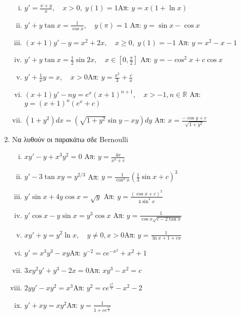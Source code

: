 \begin{enumerate}
    \begin{enumerate}[i)]
      \item  $y'=\frac{x+y}{x}, \quad x>0, \; y(1)=1$\hfill Απ: $y=x(1+\ln x)$ %
      \item $y'+y\tan x =\frac{1}{\cos x}, \quad y(\pi)=1$
        \hfill Απ: $y=\sin x-\cos x$ %
      \item $(x+1)y'-y=x^2+2x, \quad x \geq 0, \; y(1)=-1$
        \hfill Απ: $y=x^2-x-1$ %
      \item $y'+y\tan x=\frac{1}{2}\sin 2x, \quad x\in [0,\frac{\pi}{2}]$
        \hfill Απ: $y=-\cos^2 x+c\cos x$
      \item $y'+\frac{1}{x}y=x, \quad x>0$\hfill Απ: $y=\frac{x^2}{3}+\frac{c}{x}$
      \item $(x+1)y'-ny=e^x(x+1)^{n+1}, \quad x>-1, n\in \mathbb{R}$
        \hfill Απ: $y=(x+1)^n(e^x+c)$
      \item $(1+y^2)dx=(\sqrt{1+y^2}\sin y-xy)dy$
        \hfill Απ: $x=\frac{-\cos y+c}{\sqrt{1+y^2}}$
    \end{enumerate}

  \item Να λυθούν οι παρακάτω σδε Bernoulli

    \begin{enumerate}[i)]
      \item $xy'-y+x^{3}y^{2}=0$ \hfill Απ: $ y= \frac{4x}{x^{4}+c} $ %
      \item $ y'-3 \tan{xy} =y^{2/3} $  %
        \hfill Απ: $ y= \frac{1}{\cos^{3}{x}}\left(\frac{1}{3} \sin{x} + c\right)^{3}$  
      \item $ y' \sin{x} + 4y \cos{x} = \sqrt{y} $ %
        \hfill Απ: $ y= \frac{(\cos{x} +c)^{2}}{4 \sin^{4}{x}} $ 
      \item $ y' \cos{x} - y \sin{x} = y^{3} \cos{x} $  %
        \hfill Απ: $ y = \frac{1}{\cos{x} \sqrt{c- 2 \tan{x}}} $
      \item $xy'+y=y^2\ln x, \quad y\neq 0, x>0$\hfill Απ: $y=\frac{1}{\ln x+1+cx}$
      \item $y'=x^3y^3-xy$\hfill Απ: $y^{-2}=ce^{-x^2}+x^2+1$
      \item $3xy^2y'+y^3-2x=0$\hfill Απ: $xy^3-x^2=c$
      \item $2yy'-xy^2=x^3$\hfill Απ: $y^2=ce^{\frac{x^2}{2}}-x^2-2$
      \item $y'+xy=xy^2$\hfill Απ: $y=\frac{1}{1+ce^{\frac{x^2}{2}}}$
    \end{enumerate}


\end{enumerate}
